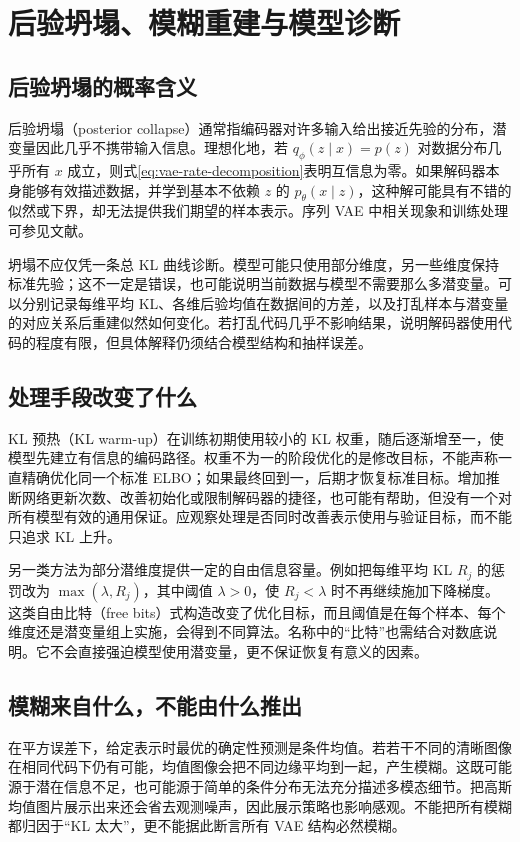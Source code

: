 \documentclass[UTF8,12pt,a4paper,fontset=fandol]{ctexart}
\begin{document}
\section{后验坍塌、模糊重建与模型诊断}
\label{sec:vae-diagnostics}

\subsection{后验坍塌的概率含义}
后验坍塌（posterior collapse）通常指编码器对许多输入给出接近先验的分布，潜变量因此几乎不携带输入信息。理想化地，若 $q_\phi(z\mid x)=p(z)$ 对数据分布几乎所有 $x$ 成立，则式\eqref{eq:vae-rate-decomposition}表明互信息为零。如果解码器本身能够有效描述数据，并学到基本不依赖 $z$ 的 $p_\theta(x\mid z)$，这种解可能具有不错的似然或下界，却无法提供我们期望的样本表示。序列 VAE 中相关现象和训练处理可参见文献\cite{bowman2016}。

坍塌不应仅凭一条总 KL 曲线诊断。模型可能只使用部分维度，另一些维度保持标准先验；这不一定是错误，也可能说明当前数据与模型不需要那么多潜变量。可以分别记录每维平均 KL、各维后验均值在数据间的方差，以及打乱样本与潜变量的对应关系后重建似然如何变化。若打乱代码几乎不影响结果，说明解码器使用代码的程度有限，但具体解释仍须结合模型结构和抽样误差。

\subsection{处理手段改变了什么}
KL 预热（KL warm-up）在训练初期使用较小的 KL 权重，随后逐渐增至一，使模型先建立有信息的编码路径。权重不为一的阶段优化的是修改目标，不能声称一直精确优化同一个标准 ELBO；如果最终回到一，后期才恢复标准目标。增加推断网络更新次数、改善初始化或限制解码器的捷径，也可能有帮助，但没有一个对所有模型有效的通用保证。应观察处理是否同时改善表示使用与验证目标，而不能只追求 KL 上升。

另一类方法为部分潜维度提供一定的自由信息容量。例如把每维平均 KL $R_j$ 的惩罚改为 $\max(\lambda,R_j)$，其中阈值 $\lambda>0$，使 $R_j<\lambda$ 时不再继续施加下降梯度。这类自由比特（free bits）式构造改变了优化目标，而且阈值是在每个样本、每个维度还是潜变量组上实施，会得到不同算法。名称中的“比特”也需结合对数底说明。它不会直接强迫模型使用潜变量，更不保证恢复有意义的因素。

\subsection{模糊来自什么，不能由什么推出}
在平方误差下，给定表示时最优的确定性预测是条件均值。若若干不同的清晰图像在相同代码下仍有可能，均值图像会把不同边缘平均到一起，产生模糊。这既可能源于潜在信息不足，也可能源于简单的条件分布无法充分描述多模态细节。把高斯均值图片展示出来还会省去观测噪声，因此展示策略也影响感观。不能把所有模糊都归因于“KL 太大”，更不能据此断言所有 VAE 结构必然模糊。
\end{document}
